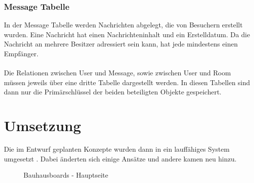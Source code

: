 \subsubsection{Message Tabelle}\label{Message Tabelle}
In der Message Tabelle werden Nachrichten abgelegt, die von Besuchern erstellt wurden. Eine Nachricht hat einen Nachrichteninhalt und ein Erstelldatum. Da die Nachricht an mehrere Besitzer adressiert sein kann, hat jede mindestens einen Empfänger.
\\
\\
Die Relationen zwischen User und Message, sowie zwischen User und Room müssen jeweils über eine dritte Tabelle dargestellt werden.
In diesen Tabellen sind dann nur die Primärschlüssel der beiden beteiligten Objekte gespeichert.






















\section{Umsetzung}\label{Umsetzung}
Die im Entwurf geplanten Konzepte wurden dann in ein lauffähiges System umgesetzt . Dabei änderten sich einige Ansätze und andere kamen neu hinzu.
\begin{figure}[h!]
  \centering
  \caption{Bauhausboards - Hauptseite}
  \label{img:finalHauptseite}
\end{figure}

